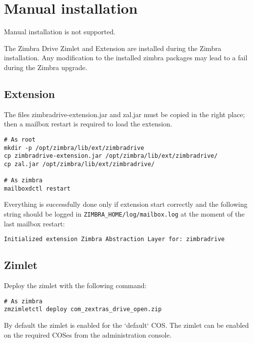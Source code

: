 \section{Manual installation}

\begin{warning}
    Manual installation is not supported.

    The Zimbra Drive Zimlet and Extension are installed during the Zimbra installation.
    Any modification to the installed zimbra packages may lead to a fail during the Zimbra upgrade.
\end{warning}

\subsection{Extension}
    The files zimbradrive-extension.jar and zal.jar must be copied in the right place;
    then a mailbox restart is required to load the extension.
    \begin{verbatim}
# As root
mkdir -p /opt/zimbra/lib/ext/zimbradrive
cp zimbradrive-extension.jar /opt/zimbra/lib/ext/zimbradrive/
cp zal.jar /opt/zimbra/lib/ext/zimbradrive/

# As zimbra
mailboxdctl restart
    \end{verbatim}
    Everything is successfully done only if extension start correctly and the following string
    should be logged in \texttt{ZIMBRA\_HOME/log/mailbox.log} at the moment of the last mailbox restart:
    \begin{verbatim}
Initialized extension Zimbra Abstraction Layer for: zimbradrive
    \end{verbatim}

\subsection{Zimlet}
    Deploy the zimlet with the following command:
    \begin{verbatim}
# As zimbra
zmzimletctl deploy com_zextras_drive_open.zip
    \end{verbatim}
    By default the zimlet is enabled for the `default` COS.
    The zimlet can be enabled on the required COSes from the administration console.
